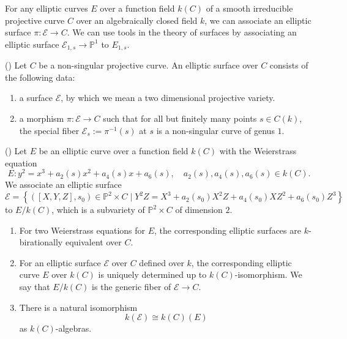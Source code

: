 \documentclass[main]{subfiles}
\begin{document}
For any elliptic curves $E$ over a function field $k(C)$ of a smooth irreducible projective curve $C$ over an algebraically closed field $k$, we can associate an elliptic surface $\pi: \mathcal{E} \to C$.
We can use tools in the theory of surfaces by associating an elliptic surface $\mathcal{E}_{1,s} \to \mathbb{P}^1$ to $E_{1,s}$.

\begin{dfn}{(\cite[III\S 3 Definition]{ref:advancedaec})}
    Let $C$ be a non-singular projective curve.
    An elliptic surface over $C$ consists of the following data:
    \begin{enumerate}[label=(\roman*)]
        \item a surface $\mathcal{E}$, by which we mean a two dimensional projective variety.
        \item a morphism $\pi: \mathcal{E} \to C$ such that for all but finitely many points $s\in C(k)$, the special fiber $\mathcal{E}_s:=\pi^{-1}(s)$ at $s$ is a non-singular curve of genus $1$.
    \end{enumerate}
\end{dfn}
\begin{prop}{(\cite[Proposition III.3.8.]{ref:advancedaec})}
    Let $E$ be an elliptic curve over a function field $k(C)$ with the Weierstrass equation
    \begin{equation*}
        E: y^{2} = x^{3} + a_2(s) x^{2} + a_4(s) x + a_6(s), \quad a_2(s), a_4(s), a_6(s) \in k(C).
    \end{equation*}
    We associate an elliptic surface
    \begin{equation*}
        \mathcal{E} = \left\{
            ([X,Y,Z], s_0)\in \mathbb{P}^2 \times C \mid Y^{2}Z = X^3 + a_2(s_0) X^2 Z + a_4(s_0) X Z^2 + a_6(s_0) Z^3
         \right\}
    \end{equation*}
    to $E/k(C)$, which is a subvariety of $\mathbb{P}^2 \times C$ of dimension $2$.
    \begin{enumerate}[label=(\alph*)]
        \item For two Weierstrass equations for $E$, the corresponding elliptic surfaces are $k$-birationally equivalent over $C$.
        \item For an elliptic surface $\mathcal{E}$ over $C$ defined over $k$, the corresponding elliptic curve $E$ over $k(C)$ is uniquely determined up to $k(C)$-isomorphism.
            We say that $E/k(C)$ is the generic fiber of $\mathcal{E} \to C$.
        \item There is a natural isomorphism
            \begin{equation*}
                k(\mathcal{E}) \cong k(C)(E)
            \end{equation*}
            as $k(C)$-algebras.
    \end{enumerate}
\end{prop}
\end{document}
